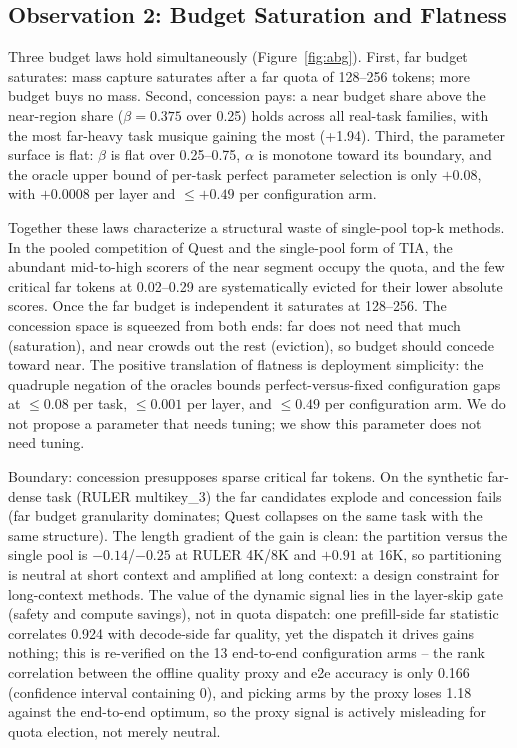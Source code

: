 \documentclass[11pt]{article}
\begin{document}
\subsection{Observation 2: Budget Saturation and Flatness}\label{sec:obsb}

Three budget laws hold simultaneously (Figure~\ref{fig:abg}). First, far budget saturates: mass capture saturates after a far quota of 128--256 tokens; more budget buys no mass. Second, concession pays: a near budget share above the near-region share ($\beta{=}0.375$ over 0.25) holds across all real-task families, with the most far-heavy task musique gaining the most (+1.94). Third, the parameter surface is flat: $\beta$ is flat over 0.25--0.75, $\alpha$ is monotone toward its boundary, and the oracle upper bound of per-task perfect parameter selection is only $+0.08$, with $+0.0008$ per layer and $\le +0.49$ per configuration arm.

Together these laws characterize a structural waste of single-pool top-k methods. In the pooled competition of Quest and the single-pool form of TIA, the abundant mid-to-high scorers of the near segment occupy the quota, and the few critical far tokens at 0.02--0.29 are systematically evicted for their lower absolute scores. Once the far budget is independent it saturates at 128--256. The concession space is squeezed from both ends: far does not need that much (saturation), and near crowds out the rest (eviction), so budget should concede toward near. The positive translation of flatness is deployment simplicity: the quadruple negation of the oracles bounds perfect-versus-fixed configuration gaps at $\leq 0.08$ per task, $\leq 0.001$ per layer, and $\leq 0.49$ per configuration arm. We do not propose a parameter that needs tuning; we show this parameter does not need tuning.

Boundary: concession presupposes sparse critical far tokens. On the synthetic far-dense task (RULER multikey\_3) the far candidates explode and concession fails (far budget granularity dominates; Quest collapses on the same task with the same structure). The length gradient of the gain is clean: the partition versus the single pool is $-0.14$/$-0.25$ at RULER 4K/8K and $+0.91$ at 16K, so partitioning is neutral at short context and amplified at long context: a design constraint for long-context methods. The value of the dynamic signal lies in the layer-skip gate (safety and compute savings), not in quota dispatch: one prefill-side far statistic correlates 0.924 with decode-side far quality, yet the dispatch it drives gains nothing; this is re-verified on the 13 end-to-end configuration arms -- the rank correlation between the offline quality proxy and e2e accuracy is only 0.166 (confidence interval containing 0), and picking arms by the proxy loses 1.18 against the end-to-end optimum, so the proxy signal is actively misleading for quota election, not merely neutral.
\end{document}
